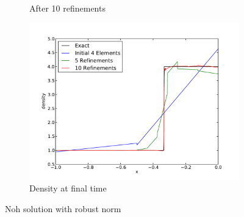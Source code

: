 \documentclass[Dissertation.tex]{subfiles}
\begin{document}
\begin{figure}[ht]
\begin{subfigure}[t]{0.32\textwidth}
\caption{After 10 refinements}
\end{subfigure}
\begin{subfigure}[t]{0.9\textwidth}
\centering
\includegraphics[width=\textwidth]{Dissertation/Noh/Robust-den.pdf}
\caption{Density at final time}
\end{subfigure}
\caption{Noh solution with robust norm}
\label{fig:NohRobust}
\end{figure}
\end{document}
